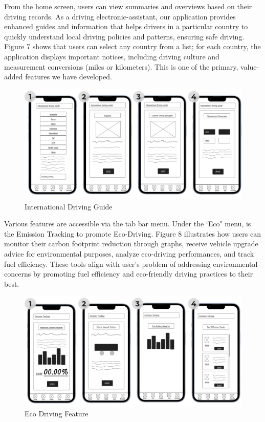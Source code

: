 \documentclass[12pt,a4paper]{article}
\begin{document}
\noindent From the home screen, users can view summaries and overviews based on their driving records. As a driving electronic-assistant, our application provides enhanced guides and information that helps drivers in a particular country to quickly understand local driving policies and patterns, ensuring safe driving. Figure 7 shows that users can select any country from a list; for each country, the application displays important notices, including driving culture and measurement conversions (miles or kilometers). This is one of the primary, value-added features we have developed.\\
\begin{figure}[h]
    \centering
    \includegraphics[width=0.8
    \textwidth]{images/Prototype Figures/Prototype Figure 2.png}
    \caption{International Driving Guide}
    \label{fig:example}
\end{figure}



\noindent Various features are accessible via the tab bar menu. Under the `Eco" menu, is the Emission Tracking to promote Eco-Driving. Figure 8 illustrates how users can monitor their carbon footprint reduction through graphs, receive vehicle upgrade advice for environmental purposes, analyze eco-driving performances, and track fuel efficiency. These tools align with user’s problem of addressing environmental concerns by promoting fuel efficiency and eco-friendly driving practices to their best.\\
\begin{figure}[h]
    \centering
    \includegraphics[width=0.8
    \textwidth]{images/Prototype Figures/Prototype Figure 3.png}
    \caption{Eco Driving Feature}
    \label{fig:example}
\end{figure}
\end{document}
